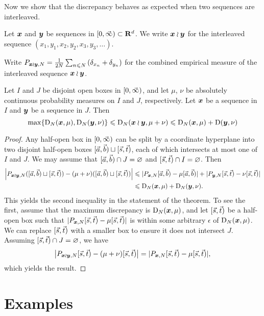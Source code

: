 Now we show that the discrepancy behaves as expected when two sequences are 
interleaved. 

\begin{definition}
Let ${\boldsymbol x}$ and ${\boldsymbol y}$ be sequences in $[0,\vec{\infty})\subset \mathbf{R}^d$. We write 
${\boldsymbol x}\wr{\boldsymbol y}$ for the interleaved sequence $(x_1,y_1,x_2,y_2,x_3,y_3,\dots)$. 
\end{definition}

Write 
$P_{{\boldsymbol x}\wr{\boldsymbol y},N} = \frac{1}{2N} \sum_{n\leqslant N} \left(\delta_{x_n} + \delta_{y_n}\right)$
for the combined empirical measure of the interleaved sequence ${\boldsymbol x}\wr{\boldsymbol y}$. 

\begin{theorem}\label{thm:wreath-seq}
Let $I$ and $J$ be disjoint open boxes in $[0,\vec{\infty})$, and let $\mu$, 
$\nu$ be absolutely continuous probability measures on $I$ and $J$, 
respectively. Let ${\boldsymbol x}$ be a sequence in $I$ and ${\boldsymbol y}$ be a sequence in $J$. 
Then 
\[
	\max\{\operatorname{D}_N({\boldsymbol x},\mu),\operatorname{D}_N({\boldsymbol y},\nu)\} \leqslant \operatorname{D}_N({\boldsymbol x}\wr{\boldsymbol y}, \mu+\nu) \leqslant \operatorname{D}_N({\boldsymbol x},\mu) + \operatorname{D}({\boldsymbol y},\nu)
\]
\end{theorem}
\begin{proof}
Any half-open box in $[0,\vec{\infty})$ can be split by a coordinate 
hyperplane into two disjoint half-open boxes $[\vec{a},\vec{b})\sqcup [\vec{s},\vec{t})$, each 
of which intersects at most one of $I$ and $J$. We may assume that 
$[\vec{a},\vec{b})\cap J=\varnothing$ and $[\vec{s},\vec{t})\cap I = \varnothing$. Then 
\begin{align*}
	\left| P_{{\boldsymbol x}\wr{\boldsymbol y},N}([\vec{a},\vec{b})\sqcup [\vec{s},\vec{t})) - (\mu+\nu)([\vec{a},\vec{b})\sqcup[\vec{s},\vec{t}))\right| 
		&\leqslant |P_{{\boldsymbol x},N}[\vec{a},\vec{b}) - \mu[\vec{a},\vec{b})| + |P_{{\boldsymbol y},N}[\vec{s},\vec{t}) - \nu[\vec{s},\vec{t})| \\
		&\leqslant \operatorname{D}_N({\boldsymbol x},\mu) + \operatorname{D}_N({\boldsymbol y},\nu) .
\end{align*}
This yields the second inequality in the statement of the theorem. To see the 
first, assume that the maximum discrepancy is $\operatorname{D}_N({\boldsymbol x},\mu)$, and let 
$[\vec{s},\vec{t})$ be a half-open box such that $|P_{{\boldsymbol x},N}[\vec{s},\vec{t}) - \mu[\vec{s},\vec{t})|$ 
is within some arbitrary $\epsilon$ of $\operatorname{D}_N({\boldsymbol x},\mu)$. We can replace 
$[\vec{s},\vec{t})$ with a smaller box to ensure it does not intersect $J$. Assuming 
$[\vec{s},\vec{t})\cap J=\varnothing$, we have
\[
	\left|P_{{\boldsymbol x}\wr{\boldsymbol y},N}[\vec{s},\vec{t}) - (\mu+\nu)[\vec{s},\vec{t})\right| = |P_{{\boldsymbol x},N}[\vec{s},\vec{t}) - \mu[\vec{s},\vec{t})| ,
\]
which yields the result. 
\end{proof}





\section{Examples}

